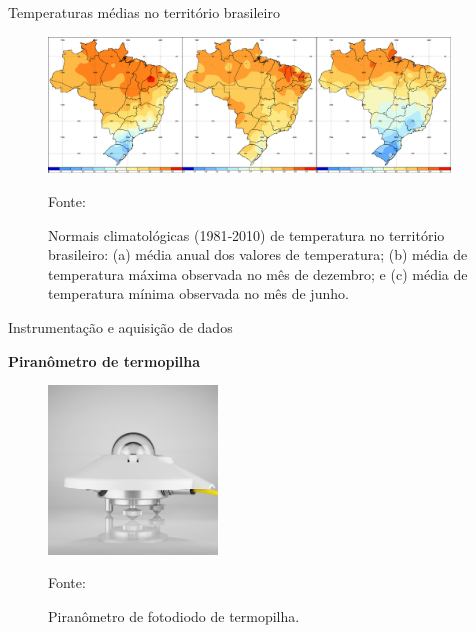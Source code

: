 \documentclass{beamer}
\begin{document}

\begin{frame}{Temperaturas médias no território brasileiro}

\begin{figure}[H]
    \centering
    \includegraphics[width=0.95\textwidth]{./Figuras/temperatura_clima.png}
    \caption{ Normais climatológicas (1981‐2010) de temperatura no território brasileiro: (a) média anual dos valores de temperatura; (b) média de temperatura máxima observada no mês de dezembro; e (c) média de temperatura mínima observada no mês de junho.}{Fonte: \cite{INMET}}
   \label{fig:temperatura_clima}
\end{figure}

\end{frame}


\begin{frame}{Instrumentação e aquisição de dados}

\textbf{Piranômetro de termopilha}

\begin{figure}[H]
    \centering
    \includegraphics[width=0.4\textwidth]{./Figuras/pirometro_termo.jpg}
    \caption{ Piranômetro de fotodiodo de termopilha.}{Fonte: \cite{kippzonen}}
   \label{fig:pirometro_termo}
\end{figure}

\end{frame}

\end{document}
